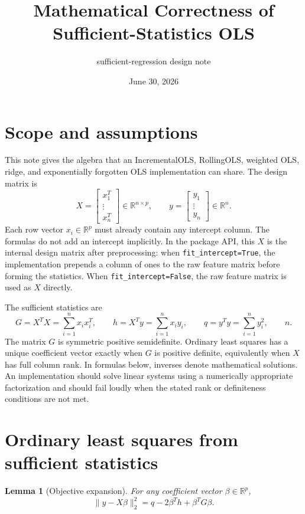 \documentclass[11pt]{article}
\title{Mathematical Correctness of Sufficient-Statistics OLS}
\author{sufficient-regression design note}
\date{June 30, 2026}
\newtheorem{lemma}{Lemma}
\begin{document}
\maketitle

\section{Scope and assumptions}

This note gives the algebra that an IncrementalOLS, RollingOLS,
weighted OLS, ridge, and exponentially forgotten OLS implementation can
share.  The design matrix is
\[
  X =
  \begin{bmatrix}
    x_1^T \\
    \vdots \\
    x_n^T
  \end{bmatrix}
  \in \mathbb{R}^{n \times p},
  \qquad
  y =
  \begin{bmatrix}
    y_1 \\
    \vdots \\
    y_n
  \end{bmatrix}
  \in \mathbb{R}^n .
\]
Each row vector \(x_i \in \mathbb{R}^p\) must already contain any
intercept column.  The formulas do not add an intercept implicitly.
In the package API, this \(X\) is the internal design matrix after
preprocessing: when \texttt{fit\_intercept=True}, the implementation
prepends a column of ones to the raw feature matrix before forming the
statistics.  When \texttt{fit\_intercept=False}, the raw feature matrix
is used as \(X\) directly.

The sufficient statistics are
\[
  G = X^T X = \sum_{i=1}^n x_i x_i^T,\qquad
  h = X^T y = \sum_{i=1}^n x_i y_i,\qquad
  q = y^T y = \sum_{i=1}^n y_i^2,\qquad
  n .
\]
The matrix \(G\) is symmetric positive semidefinite.  Ordinary least
squares has a unique coefficient vector exactly when \(G\) is positive
definite, equivalently when \(X\) has full column rank.  In formulas
below, inverses denote mathematical solutions.  An implementation should
solve linear systems using a numerically appropriate factorization and
should fail loudly when the stated rank or definiteness conditions are
not met.

\section{Ordinary least squares from sufficient statistics}

\begin{lemma}[Objective expansion]
For any coefficient vector \(\beta \in \mathbb{R}^p\),
\[
  \|y - X\beta\|_2^2
  = q - 2\beta^T h + \beta^T G\beta .
\]
\end{lemma}
\end{document}
